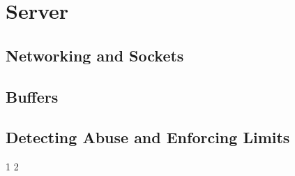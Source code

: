 \section{Server}

\subsection{Networking and Sockets}

\subsection{Buffers}

\subsection{Detecting Abuse and Enforcing Limits}
1
2
